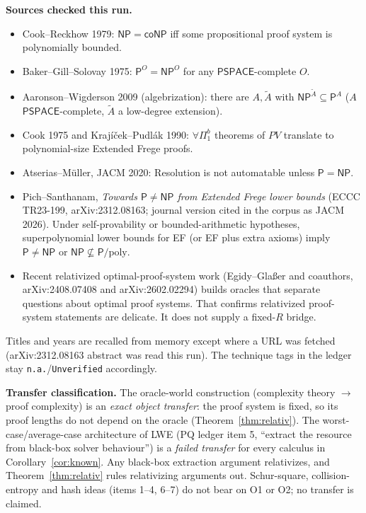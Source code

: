 \documentclass[11pt]{article}
\theoremstyle{definition}
\newcommand{\Pclass}{\mathsf{P}}
\newcommand{\NP}{\mathsf{NP}}
\newcommand{\coNP}{\mathsf{coNP}}
\newcommand{\PSPACE}{\mathsf{PSPACE}}
\begin{document}
\textbf{Sources checked this run.}
\begin{itemize}
\item Cook--Reckhow 1979: $\NP=\coNP$ iff some propositional proof system is
polynomially bounded.
\item Baker--Gill--Solovay 1975: $\Pclass^O=\NP^O$ for any $\PSPACE$-complete $O$.
\item Aaronson--Wigderson 2009 (algebrization): there are $A,\tilde A$ with
$\NP^{\tilde A}\subseteq\Pclass^{A}$ ($A$ $\PSPACE$-complete, $\tilde A$ a
low-degree extension).
\item Cook 1975 and Krajíček--Pudlák 1990: $\forall\Pi^b_1$ theorems of $PV$
translate to polynomial-size Extended Frege proofs.
\item Atserias--Müller, JACM 2020: Resolution is not automatable unless
$\Pclass=\NP$.
\item Pich--Santhanam, \emph{Towards $\Pclass\ne\NP$ from Extended Frege lower
bounds} (ECCC TR23-199, arXiv:2312.08163; journal version cited in the corpus
as JACM 2026). Under self-provability or bounded-arithmetic hypotheses,
superpolynomial lower bounds for EF (or EF plus extra axioms) imply
$\Pclass\ne\NP$ or $\NP\not\subseteq\Pclass/\mathrm{poly}$.
\item Recent relativized optimal-proof-system work (Egidy--Glaßer and coauthors,
arXiv:2408.07408 and arXiv:2602.02294) builds oracles that separate questions
about optimal proof systems. That confirms relativized proof-system statements
are delicate. It does not supply a fixed-$R$ bridge.
\end{itemize}
Titles and years are recalled from memory except where a URL was fetched
(arXiv:2312.08163 abstract was read this run). The technique tags in the
ledger stay \texttt{n.a.}/\texttt{Unverified} accordingly.

\textbf{Transfer classification.} The oracle-world construction (complexity
theory $\to$ proof complexity) is an \emph{exact object transfer}: the
proof system is fixed, so its proof lengths do not depend on the oracle
(Theorem~\ref{thm:relativ}). The worst-case/average-case architecture of LWE
(PQ ledger item 5, ``extract the resource from black-box solver behaviour'')
is a \emph{failed transfer} for every calculus in Corollary~\ref{cor:known}.
Any black-box extraction argument relativizes, and Theorem~\ref{thm:relativ}
rules relativizing arguments out. Schur-square, collision-entropy and hash
ideas (items 1--4, 6--7) do not bear on O1 or O2; no transfer is claimed.
\end{document}
